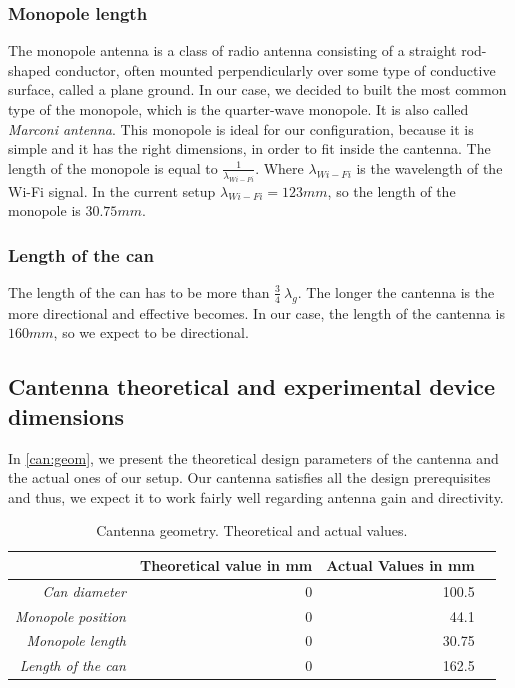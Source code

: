 \documentclass[12pt,a4paper]{article}
\begin{document}
		\subsubsection{Monopole length}
			The monopole antenna is a class of radio antenna consisting of a straight rod-shaped conductor, often mounted perpendicularly over some type of conductive surface, called a plane ground. In our case, we decided to built the most common type of the monopole, which is the quarter-wave monopole. It is also called \emph{Marconi antenna}. This monopole is ideal for our configuration, because it is simple and it has the right dimensions, in order to fit inside the cantenna. The length of the monopole is equal to $\frac{1}{\lambda_{Wi-Fi}}$. Where  $\lambda_{Wi-Fi}$ is the wavelength of the Wi-Fi signal. In the current setup $\lambda_{Wi-Fi} = 123mm$, so the length of the monopole is $30.75mm$.
		
		\subsubsection{Length of the can}
			The length of the can has to be more than $\frac{3}{4}\ {\lambda_g}$. The longer the cantenna is the more directional and effective becomes. In our case, the length of the cantenna is $160mm$, so we expect to be directional.
	
	\subsection{Cantenna theoretical and experimental device dimensions} 
		In \autoref{can:geom}, we present the theoretical design parameters of the cantenna and the actual ones of our setup. Our cantenna satisfies all the design prerequisites and thus, we expect it to work fairly well regarding antenna gain and directivity.

		\begin{table}
			\begin{center}
				\begin{tabular}{r|r|r|r}\
				 & Theoretical value in mm& Actual Values in mm\\
				 \hline 
				 \emph{Can diameter} & 0 & 100.5\\
				 \emph{Monopole position} & 0 & 44.1 \\
				 \emph{Monopole length} & 0 & 30.75\\
				 \emph{Length of the can} & 0 & 162.5\\
				\end{tabular}
			\end{center}
			\caption{Cantenna geometry. Theoretical and actual values.}
			\label{can:geom}
		\end{table}
\end{document}
